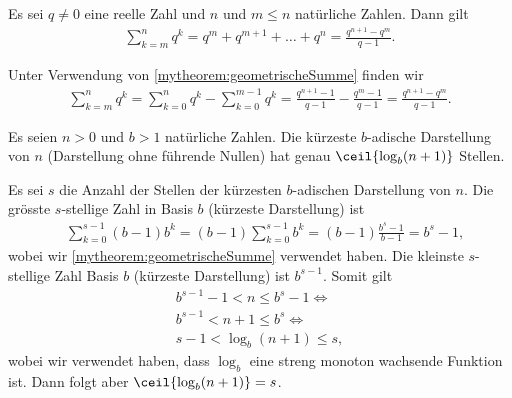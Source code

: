 \begin{mytheorem}\label{mytheorem:verallgemeinertegeometrischeSumme}
	Es sei $q \neq 0$ eine reelle Zahl und $n$ und $m\leq n$ natürliche Zahlen. Dann gilt
	\begin{align*}
		\sum_{k = m}^n q^k = q^m + q^{m+1} + \ldots + q^n = \frac{q^{n+1}-q^m}{q-1}.
	\end{align*}
	\begin{myproof}
		Unter Verwendung von \cref{mytheorem:geometrischeSumme} finden wir
		\begin{align*}
			\sum_{k = m}^n q^k =
			\sum_{k = 0}^n q^k - \sum_{k = 0}^{m-1} q^k =
			\frac{q^{n+1}-1}{q-1} - \frac{q^m - 1}{q-1} =
			\frac{q^{n+1}-q^m}{q-1}.
		\end{align*}
	\end{myproof}
\end{mytheorem}


\begin{mytheorem}\label{mytheorem:AnzahlZiffern}
	Es seien $n>0$ und $b>1$ natürliche Zahlen. Die kürzeste $b$-adische Darstellung von $n$ (Darstellung ohne führende Nullen) hat genau $\ceil{\log_b(n + 1)}$ Stellen.
	\begin{myproof}
		Es sei $s$ die Anzahl der Stellen der kürzesten $b$-adischen Darstellung von $n$. Die grösste $s$-stellige Zahl in Basis $b$ (kürzeste Darstellung) ist
		\begin{align*}
			 & \sum_{k = 0}^{s-1} (b-1)b^{k} = (b-1)\sum_{k = 0}^{s-1} b^{k} = (b-1)\frac{b^s - 1}{b - 1} = b^s - 1,
		\end{align*}
		wobei wir \cref{mytheorem:geometrischeSumme} verwendet haben. Die kleinste $s$-stellige Zahl Basis $b$ (kürzeste Darstellung) ist $b^{s-1}$. Somit gilt
		\begin{align*}
			b^{s-1} - 1 < n \leq b^s - 1 \iff \\
			b^{s-1} < n + 1 \leq b^s \iff     \\
			s-1 < \log_b(n+1) \leq s,
		\end{align*}
		wobei wir verwendet haben, dass $\log_b$ eine streng monoton wachsende Funktion ist.
		Dann folgt aber $\ceil{\log_b(n + 1)} = s$.
	\end{myproof}
\end{mytheorem}



